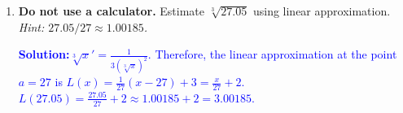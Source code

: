 \documentclass[letterpaper,11pt]{article}
\newcommand{\sol}[2]{\begin{minipage}[c][#1]{\linewidth}{\textcolor{blue}{\textbf{Solution:}}\quad \textcolor{blue}{#2}}\end{minipage}}
\newcommand{\sol}[2]{\begin{minipage}[c][#1]{\linewidth}{\vfill}\end{minipage}}
\begin{document}
\begin{enumerate}
\item \textbf{Do not use a calculator.} Estimate $\sqrt[3]{27.05}$ using linear approximation. \textit{Hint: $27.05/27 \approx 1.00185$.}

\sol{}{$\sqrt[3]{x} ' = \frac{1}{3(\sqrt[3]{x})^2}$. Therefore, the linear approximation at the point $a = 27$ is $L(x) = \frac{1}{27}(x-27)+3 = \frac{x}{27} + 2$. $L(27.05) = \frac{27.05}{27} + 2 \approx 1.00185 + 2 = 3.00185$.}
\end{enumerate}
\end{document}
